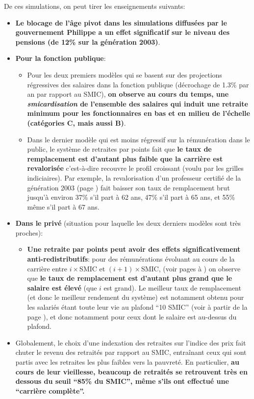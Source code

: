 De ces simulations, on peut tirer les enseignements suivants:
\begin{itemize}
\item {\bf Le blocage de l'âge pivot dans les simulations diffusées par le gouvernement Philippe a un effet significatif sur le niveau des pensions (de 12\% sur la génération 2003)}. 
\item {\bf Pour la fonction publique}:
  \begin{itemize}
  \item Pour les deux premiers modèles qui se basent sur des projections régressives des salaires dans la fonction publique (décrochage de 1.3\% par an par rapport au SMIC), {\bf on observe au cours du temps,  une \emph{smicardisation} de l'ensemble des salaires qui induit une retraite minimum pour les fonctionnaires en bas et en milieu de l'échelle (catégories C, mais aussi B)}.
  \item Dans le dernier modèle qui est moins régressif sur la rémunération dans le public, le système de retraites par points fait que {\bf le taux de remplacement est d'autant plus faible que la carrière est revalorisée} c'est-à-dire recouvre le profil croissant (voulu par les grilles indiciaires). Par exemple, la revalorisation d'un professeur certifié de la génération 2003 (page \pageref{ProfEcoles_100_2003_22_0}) fait baisser son taux de remplacement brut jusqu'à environ 37\% s'il part à 62 ans, 47\% s'il part à 65 ans, et 55\% même s'il part à 67 ans.
  \end{itemize}
\item {\bf Dans le privé} (situation pour laquelle les deux derniers modèles sont très proches):
  \begin{itemize}
  \item {\bf Une retraite par points peut avoir des effets significativement anti-redistributifs}: pour des rémunérations évoluant au cours de la carrière entre $i \times$SMIC et $(i+1)\times$SMIC, (voir pages \pageref{Ascendant12_100_1975_22_0} à \pageref{Ascendant45_100_2003_22_0}) on observe que {\bf le taux de remplacement est d'autant plus grand que le salaire est élevé} (que $i$ est grand). Le meilleur taux de remplacement (et donc le meilleur rendement du système) est notamment obtenu pour les salariés étant toute leur vie au plafond ``10 SMIC'' (voir à partir de la page \pageref{10SMIC_100_1975_22_0}), et donc notamment pour ceux dont le salaire est au-dessus du plafond.
  \end{itemize}
\item Globalement, le choix d'une indexation des retraites sur l'indice des prix fait chuter le revenu des retraités par rapport au SMIC, entraînant ceux qui sont partis avec les retraites les plus faibles vers la pauvreté. En particulier, {\bf au cours de leur vieillesse, beaucoup de retraités se retrouvent très en dessous du seuil ``85\% du SMIC'', même s'ils ont effectué une ``carrière complète''.}

\end{itemize}
